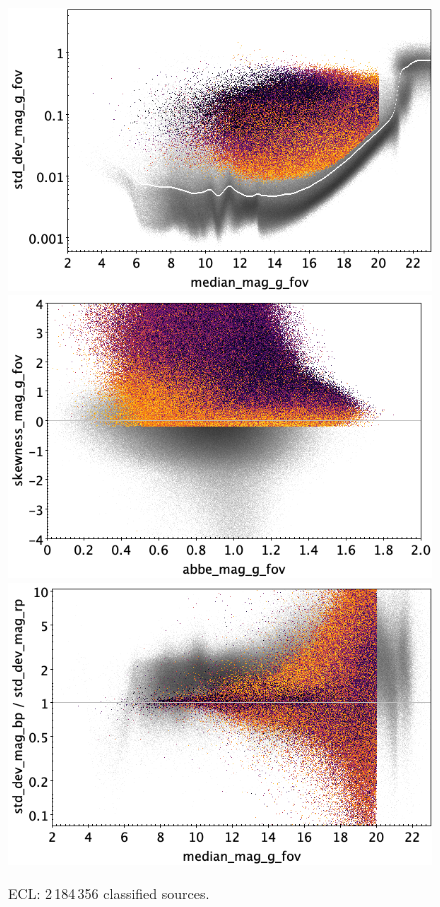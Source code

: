 \documentclass[longauth]{aa}
\begin{document}
\begin{appendix}
\begin{figure}
\hspace{2mm}
 \includegraphics[width=0.45\hsize]{figures/appendix/ECL_cls_msd.png} \\ %
\vspace{4mm}
 \includegraphics[width=0.45\hsize]{figures/appendix/ECL_cls_ask.png}  %
\hspace{2mm}
 \includegraphics[width=0.45\hsize]{figures/appendix/ECL_cls_msdr.png}  \\ %
\vspace{4mm}
 \caption{ECL: 2\,184\,356 classified sources.}  
 \label{fig:app:ECL}
\end{figure}


\end{appendix}
\end{document}
